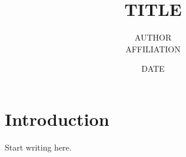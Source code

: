 \documentclass{article}
\title{{{TITLE}}}
\author{{{AUTHOR}} \\ {{AFFILIATION}}}
\date{{{DATE}}}
\begin{document}
\maketitle
\section{Introduction}
Start writing here.
\end{document}
